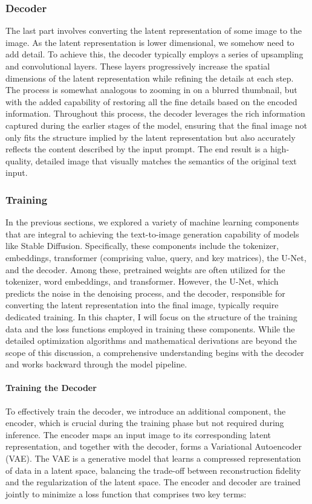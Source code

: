 \documentclass[11pt]{article}
\begin{document}
\subsubsection{Decoder}
The last part involves converting the latent representation of some image to the image. As the latent representation is lower dimensional, we somehow need to add detail. To achieve this, the decoder typically employs a series of upsampling and convolutional layers. These layers progressively increase the spatial dimensions of the latent representation while refining the details at each step. The process is somewhat analogous to zooming in on a blurred thumbnail, but with the added capability of restoring all the fine details based on the encoded information.
Throughout this process, the decoder leverages the rich information captured during the earlier stages of the model, ensuring that the final image not only fits the structure implied by the latent representation but also accurately reflects the content described by the input prompt. The end result is a high-quality, detailed image that visually matches the semantics of the original text input.


\subsubsection{Training}
\label{sec:stabel_diffusion:training}
In the previous sections, we explored a variety of machine learning components that are integral to achieving the text-to-image generation capability of models like Stable Diffusion. Specifically, these components include the tokenizer, embeddings, transformer (comprising value, query, and key matrices), the U-Net, and the decoder. Among these, pretrained weights are often utilized for the tokenizer, word embeddings, and transformer. However, the U-Net, which predicts the noise in the denoising process, and the decoder, responsible for converting the latent representation into the final image, typically require dedicated training. In this chapter, I will focus on the structure of the training data and the loss functions employed in training these components. While the detailed optimization algorithms and mathematical derivations are beyond the scope of this discussion, a comprehensive understanding begins with the decoder and works backward through the model pipeline.

\paragraph{Training the Decoder}
To effectively train the decoder, we introduce an additional component, the encoder, which is crucial during the training phase but not required during inference. The encoder maps an input image to its corresponding latent representation, and together with the decoder, forms a Variational Autoencoder (VAE)\cite{kingma2022autoencodingvariationalbayes}. The VAE is a generative model that learns a compressed representation of data in a latent space, balancing the trade-off between reconstruction fidelity and the regularization of the latent space. The encoder and decoder are trained jointly to minimize a loss function that comprises two key terms:
\end{document}
